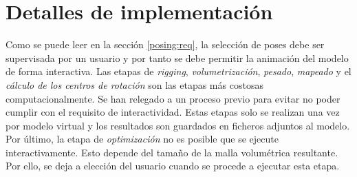 \section{Detalles de implementación}
\label{posing:preprocess}

Como se puede leer en la sección \ref{posing:req}, la selección de poses debe ser supervisada por un usuario y por tanto se debe permitir la animación del modelo de forma interactiva. 
Las etapas de \emph{rigging}, \emph{volumetrización}, \emph{pesado}, \emph{mapeado} y el \emph{cálculo de los centros de rotación} son las etapas más costosas computacionalmente. Se han relegado a un proceso previo para evitar no poder cumplir con el requisito de interactividad. Estas etapas solo se realizan una vez por modelo virtual y los resultados son guardados en ficheros adjuntos al modelo. 
Por último, la etapa de \emph{optimización} no es posible que se ejecute interactivamente. Esto depende del tamaño de la malla volumétrica resultante. Por ello, se deja a elección del usuario cuando se procede a ejecutar esta etapa.


